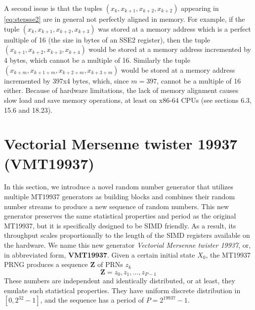 \documentclass[preprint,1p,times]{elsarticle}
\begin{document}
	A second issue is that the tuples $(x_k, x_{k+1}, x_{k+2}, x_{k+2})$ appearing in \eqref{eq:stepsse2} are in general not perfectly aligned in memory. For example, if the tuple $(x_k, x_{k+1}, x_{k+2}, x_{k+3})$ was stored at a memory address which is a perfect multiple of 16 (the size in bytes of an SSE2 register), then the tuple $(x_{k+1}, x_{k+2}, x_{k+3}, x_{k+4})$ would be stored at a memory address incremented by 4 bytes, which cannot be a multiple of 16. Similarly the tuple $(x_{k+m}, x_{k+1+m}, x_{k+2+m}, x_{k+3+m})$ would be stored at a memory address incremented by 397x4 bytes, which, since $m=397$, cannot be a multiple of 16 either. Because of hardware limitations, the lack of memory alignment causes slow load and save memory operations, at least on x86-64 CPUs (see \cite{intel} sections 6.3, 15.6 and 18.23).
	
	\section{Vectorial Mersenne twister 19937 (VMT19937)}
	\label{sec:simdgen}
	In this section, we introduce a novel random number generator that utilizes multiple MT19937 generators as building blocks and combines their random number streams to produce a new sequence of random numbers. This new generator preserves the same statistical properties and period as the original MT19937, but it is specifically designed to be SIMD friendly. As a result, its throughput scales proportionally to the length of the SIMD registers available on the hardware. We name this new generator \textit{Vectorial Mersenne twister 19937}, or, in abbreviated form, \textbf{VMT19937}.
	Given a certain initial state $X_0$, the MT19937 PRNG produces a sequence $\boldsymbol{Z}$ of PRNs $z_k$
	\begin{equation}
		\label{eq:mainseq}
		\boldsymbol{Z} = z_0, z_1, \dots, z_{P-1} 
	\end{equation}
	These numbers are independent and identically distributed, or at least, they emulate such statistical properties. They have uniform discrete distribution in $[0, 2^{32}-1]$, and the sequence has a period of $P=2^{19937}-1$.
	
\end{document}
